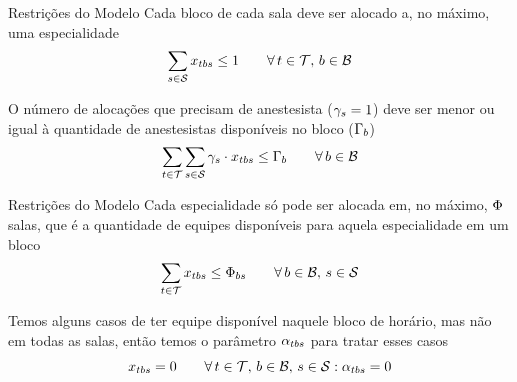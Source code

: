 \documentclass[handout]{beamer}
\begin{document}
\begin{frame}{Restrições do Modelo}
    Cada bloco de cada sala deve ser alocado a, no máximo, uma especialidade
    \begin{equation}
    \label{eq:m2-4}
        \sum_{s \in \mathcal{S}} x_{tbs} \leq 1 \hspace{2em} \forall\, t \in \mathcal{T},\, b \in \mathcal{B}
    \end{equation}
    \vspace{2em}

    O número de alocações que precisam de anestesista ($\gamma_s = 1$) deve ser menor ou igual à quantidade de anestesistas disponíveis no bloco ($\Gamma_{b}$)
    \begin{equation}
    \label{eq:m2-5}
        \sum_{t \in \mathcal{T}} \sum_{s \in \mathcal{S}} \gamma_{s} \cdot x_{tbs} \leq \Gamma_{b} \hspace{2em} \forall\, b \in \mathcal{B}
    \end{equation}
\end{frame}


\begin{frame}{Restrições do Modelo}
    Cada especialidade só pode ser alocada em, no máximo, $\Phi$ salas, que é a quantidade de equipes disponíveis para aquela especialidade em um bloco
    \begin{equation}
    \label{eq:m2-6}
        \sum_{t \in \mathcal{T}} x_{tbs} \leq \Phi_{bs} \hspace{2em} \forall\, b \in \mathcal{B},\, s \in \mathcal{S}
    \end{equation}
    \vspace{2em}

    Temos alguns casos de ter equipe disponível naquele bloco de horário, mas não em todas as salas, então temos o parâmetro $\alpha_{tbs}$ para tratar esses casos
    \begin{equation}
    \label{eq:m2-7}
        x_{tbs} = 0 \hspace{2em} \forall\, t \in \mathcal{T},\,b \in \mathcal{B},\, s \in \mathcal{S} : \alpha_{tbs} = 0
    \end{equation}
\end{frame}
   
\end{document}
